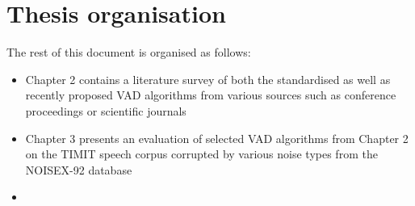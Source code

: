 
\section{Thesis organisation}

The rest of this document is organised as follows:
\begin{itemize}
\item Chapter 2 contains a literature survey of both the standardised as well as recently proposed VAD algorithms from various sources such as conference proceedings or scientific journals
\item Chapter 3 presents an evaluation of selected VAD algorithms from Chapter 2 on the TIMIT speech corpus corrupted by various noise types from the NOISEX-92 database
\item 
\end{itemize}